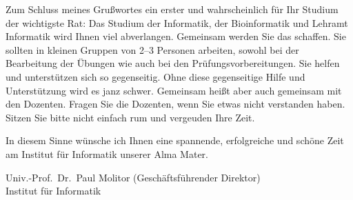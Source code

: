 Zum Schluss meines Grußwortes ein erster und wahrscheinlich für Ihr Studium der
wichtigste Rat: Das Studium der Informatik, der Bioinformatik und Lehramt
Informatik wird Ihnen viel abverlangen. Gemeinsam werden Sie das schaffen. Sie
sollten in kleinen Gruppen von 2--3 Personen arbeiten, sowohl bei der
Bearbeitung der Übungen wie auch bei den Prüfungsvorbereitungen. Sie helfen und
unterstützen sich so gegenseitig. Ohne diese gegenseitige Hilfe und
Unterstützung wird es janz schwer. Gemeinsam heißt aber auch gemeinsam mit den
Dozenten. Fragen Sie die Dozenten, wenn Sie etwas nicht verstanden haben. Sitzen
Sie bitte nicht einfach rum und vergeuden Ihre Zeit.

In diesem Sinne wünsche ich Ihnen eine spannende, erfolgreiche und schöne Zeit
am Institut für Informatik unserer Alma Mater.

Univ.-Prof.\ Dr.\ Paul Molitor (Geschäftsführender Direktor)\\
Institut für Informatik
